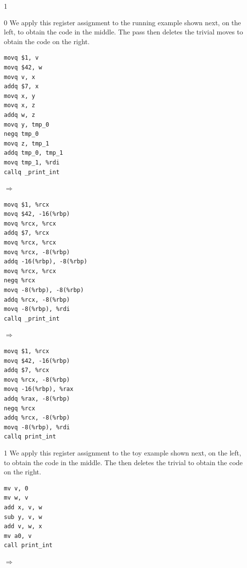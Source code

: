 \documentclass[7x10]{TimesAPriori_MIT}%
\def\pythonEd{1}
\def\edition{1}
\def\xeightysixEd{0}
\def\riscvEd{1}
\def\architecture{1}
\newcommand{\pythonColor}[0]{}
\numberwithin{theorem}{chapter}
\numberwithin{definition}{chapter}
\numberwithin{equation}{chapter}
\begin{document}
{\if\edition\pythonEd\pythonColor
{\if\architecture\xeightysixEd
We apply this register assignment to the running example shown next,
on the left, to obtain the code in the middle.  The
 pass then deletes the trivial moves to obtain
the code on the right.
\begin{center}
\begin{minipage}{0.20\textwidth}
\begin{lstlisting}[basicstyle=\ttfamily\footnotesize]
movq $1, v
movq $42, w
movq v, x
addq $7, x
movq x, y
movq x, z
addq w, z
movq y, tmp_0
negq tmp_0
movq z, tmp_1
addq tmp_0, tmp_1
movq tmp_1, %rdi
callq _print_int
\end{lstlisting}
\end{minipage}
${\Rightarrow\qquad}$
\begin{minipage}{0.35\textwidth}
\begin{lstlisting}[basicstyle=\ttfamily\footnotesize]
movq $1, %rcx
movq $42, -16(%rbp)
movq %rcx, %rcx
addq $7, %rcx
movq %rcx, %rcx
movq %rcx, -8(%rbp)
addq -16(%rbp), -8(%rbp)
movq %rcx, %rcx
negq %rcx
movq -8(%rbp), -8(%rbp)
addq %rcx, -8(%rbp)
movq -8(%rbp), %rdi
callq _print_int
\end{lstlisting}
\end{minipage}
${\Rightarrow\qquad}$
\begin{minipage}{0.20\textwidth}
\begin{lstlisting}[basicstyle=\ttfamily\footnotesize]
movq $1, %rcx
movq $42, -16(%rbp)
addq $7, %rcx
movq %rcx, -8(%rbp)
movq -16(%rbp), %rax
addq %rax, -8(%rbp)
negq %rcx
addq %rcx, -8(%rbp)
movq -8(%rbp), %rdi
callq print_int
\end{lstlisting}
\end{minipage}
\end{center}
\fi}
{\if\architecture\riscvEd
We apply this register assignment to the toy example shown next,
on the left, to obtain the code in the middle. The
 then deletes the trivial  to obtain
the code on the right.
\begin{center}
\begin{minipage}{0.20\textwidth}
\begin{lstlisting}
mv v, 0
mv w, v
add x, v, w
sub y, v, w
add v, w, x
mv a0, v
call print_int
\end{lstlisting}
\end{minipage}
${\Rightarrow\qquad}$
\begin{minipage}{0.20\textwidth}
\begin{lstlisting}

\end{lstlisting}
\end{minipage}
\end{center}}}
\end{document}
